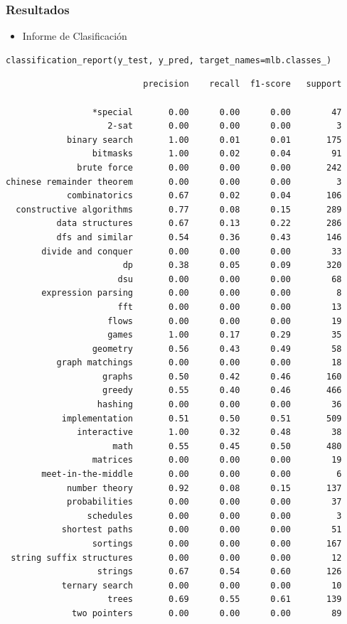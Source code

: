\documentclass{article}
\begin{document}
		\subsubsection{Resultados}
		\begin{itemize}
    			\item Informe de Clasificación
		\end{itemize}
\begin{verbatim}
classification_report(y_test, y_pred, target_names=mlb.classes_)
\end{verbatim}

\begin{verbatim}
                           precision    recall  f1-score   support

                 *special       0.00      0.00      0.00        47
                    2-sat       0.00      0.00      0.00         3
            binary search       1.00      0.01      0.01       175
                 bitmasks       1.00      0.02      0.04        91
              brute force       0.00      0.00      0.00       242
chinese remainder theorem       0.00      0.00      0.00         3
            combinatorics       0.67      0.02      0.04       106
  constructive algorithms       0.77      0.08      0.15       289
          data structures       0.67      0.13      0.22       286
          dfs and similar       0.54      0.36      0.43       146
       divide and conquer       0.00      0.00      0.00        33
                       dp       0.38      0.05      0.09       320
                      dsu       0.00      0.00      0.00        68
       expression parsing       0.00      0.00      0.00         8
                      fft       0.00      0.00      0.00        13
                    flows       0.00      0.00      0.00        19
                    games       1.00      0.17      0.29        35
                 geometry       0.56      0.43      0.49        58
          graph matchings       0.00      0.00      0.00        18
                   graphs       0.50      0.42      0.46       160
                   greedy       0.55      0.40      0.46       466
                  hashing       0.00      0.00      0.00        36
           implementation       0.51      0.50      0.51       509
              interactive       1.00      0.32      0.48        38
                     math       0.55      0.45      0.50       480
                 matrices       0.00      0.00      0.00        19
       meet-in-the-middle       0.00      0.00      0.00         6
            number theory       0.92      0.08      0.15       137
            probabilities       0.00      0.00      0.00        37
                schedules       0.00      0.00      0.00         3
           shortest paths       0.00      0.00      0.00        51
                 sortings       0.00      0.00      0.00       167
 string suffix structures       0.00      0.00      0.00        12
                  strings       0.67      0.54      0.60       126
           ternary search       0.00      0.00      0.00        10
                    trees       0.69      0.55      0.61       139
             two pointers       0.00      0.00      0.00        89


\end{verbatim}
\end{document}
